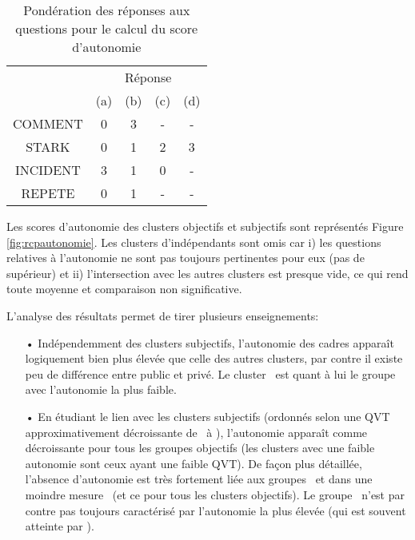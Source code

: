 \documentclass[11pt,fleqn,openany,frenchb]{book} %
\begin{document}
\bgroup
\def\arraystretch{1.5}
\begin{table}[!h]
\centering
\begin{tabular}{|c|c|c|c|c|}
\cline{2-5}
\multicolumn{1}{c}{}&\multicolumn{4}{|c|}{Réponse}\\ \cline{2-5}
\multicolumn{1}{c}{} & \multicolumn{1}{|c}{(a)} & \multicolumn{1}{|c}{(b)} & \multicolumn{1}{|c}{(c)}  & \multicolumn{1}{|c|}{(d)} \\ \hline
COMMENT & 0 & 3 & - & - \\ 
\hline 
STARK & 0 & 1 & 2 & 3 \\
\hline
INCIDENT & 3 & 1 & 0 & - \\ 
\hline 
REPETE & 0 & 1 & - & - \\
\hline

\end{tabular}
\caption{Pondération des réponses aux questions pour le calcul du score d'autonomie}

\label{tab:autonomiescore}
\end{table}
\bgroup
\def\arraystretch{1}

Les scores d'autonomie des clusters objectifs et subjectifs sont représentés Figure \ref{fig:rcpautonomie}. Les clusters d'indépendants sont omis car i) les questions relatives à l'autonomie ne sont pas toujours pertinentes pour eux (pas de supérieur) et ii) l'intersection avec les autres clusters est presque vide, ce qui rend toute moyenne et comparaison non significative.

L'analyse des résultats permet de tirer plusieurs enseignements:
    \begin{itemize}
    \item[•] Indépendemment des clusters subjectifs, l'autonomie des cadres apparaît logiquement bien plus élevée que celle des autres clusters, par contre il existe peu de différence entre public et privé. Le cluster \SANTE\ est quant à lui le groupe avec l'autonomie la plus faible.
    \item[•] En étudiant le lien avec les clusters subjectifs (ordonnés selon une QVT approximativement décroissante de \HEUR\ à \MALH), l'autonomie apparaît comme décroissante pour tous les groupes objectifs (les clusters avec une faible autonomie sont ceux ayant une faible QVT). De façon plus détaillée, l'absence d'autonomie est très fortement liée aux groupes \MALH\ et dans une moindre mesure \ENV\ (et ce pour tous les clusters objectifs). Le groupe \HEUR\ n'est par contre pas toujours caractérisé par l'autonomie la plus élevée (qui est souvent atteinte par \RAS ).  
    \end{itemize}
\end{document}
